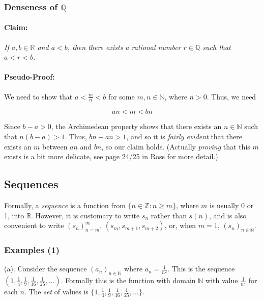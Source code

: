 \documentclass[]{article}
\begin{document}
\subsubsection{Denseness of $\mathbb{Q}$}

\paragraph{Claim:}

\emph{If $a,b \in \mathbb{R}$ and $a<b$, then there exists a rational
number $r \in \mathbb{Q}$ such that $a < r < b$.}

\paragraph{Pseudo-Proof:}

We need to show that $a < \frac{m}{n} < b$ for some
$m,n \in \mathbb{N}$, where $n > 0$. Thus, we need

\[ an < m < bn \]

Since $b-a > 0$, the Archimedean property shows that there exists an
$n \in \mathbb{N}$ such that $n(b-a) > 1$. Thus, $bn - an > 1$, and so
it is \emph{fairly evident} that there exists an $m$ between $an$ and
$bn$, so our claim holds. (Actually \emph{proving} that this $m$ exists
is a bit more delicate, see page 24/25 in Ross for more detail.)

\subsection{Sequences}

Formally, a \emph{sequence} is a function from
$\{ n \in \mathbb{Z}: n \ge m\}$, where $m$ is usually 0 or 1, into
$\mathbb{R}$. However, it is customary to write $s_n$ rather than
$s(n)$, and is also convenient to write $(s_n)_{n=m}^{\infty}$,
$(s_m, s_{m+1}, s_{m+2})$, or, when $m = 1$, $(s_n)_{n \in \mathbb{N}}$.

\subsubsection{Examples (1)}

(a). Consider the sequence $(a_n)_{n \in \mathbb{N}}$ where
$a_n = \frac{1}{n^2}$. This is the sequence
$(1, \frac{1}{4}, \frac{1}{9}, \frac{1}{16}, \frac{1}{25}, ...)$.
Formally this is the function with domain $\mathbb{N}$ with value
$\frac{1}{n^2}$ for each $n$. The \emph{set} of values is
$\{1, \frac{1}{4}, \frac{1}{9}, \frac{1}{16}, \frac{1}{25}, ...\}$.
\end{document}
